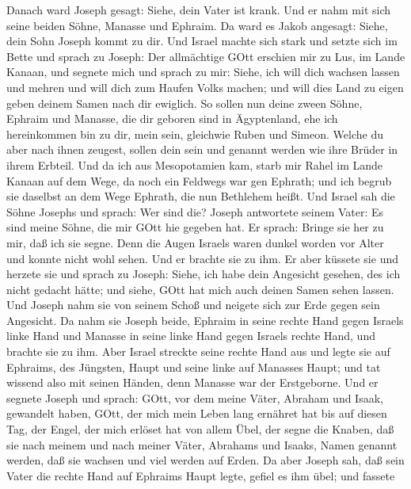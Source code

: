  Danach ward Joseph gesagt: Siehe, dein Vater ist krank. Und
er nahm mit sich seine beiden Söhne, Manasse und Ephraim. 
Da ward es Jakob angesagt: Siehe, dein Sohn Joseph kommt zu dir. Und
Israel machte sich stark und setzte sich im Bette  und
sprach zu Joseph: Der allmächtige GOtt erschien mir zu Lus, im Lande
Kanaan, und segnete mich  und sprach zu mir: Siehe, ich will
dich wachsen lassen und mehren und will dich zum Haufen Volks machen;
und will dies Land zu eigen geben deinem Samen nach dir ewiglich.
 So sollen nun deine zween Söhne, Ephraim und Manasse, die
dir geboren sind in Ägyptenland, ehe ich hereinkommen bin zu dir, mein
sein, gleichwie Ruben und Simeon.  Welche du aber nach ihnen
zeugest, sollen dein sein und genannt werden wie ihre Brüder in ihrem
Erbteil.  Und da ich aus Mesopotamien kam, starb mir Rahel
im Lande Kanaan auf dem Wege, da noch ein Feldwegs war gen Ephrath; und
ich begrub sie daselbst an dem Wege Ephrath, die nun Bethlehem heißt.
 Und Israel sah die Söhne Josephs und sprach: Wer sind die?
 Joseph antwortete seinem Vater: Es sind meine Söhne, die
mir GOtt hie gegeben hat. Er sprach: Bringe sie her zu mir, daß ich sie
segne.  Denn die Augen Israels waren dunkel worden vor
Alter und konnte nicht wohl sehen. Und er brachte sie zu ihm. Er aber
küssete sie und herzete sie  und sprach zu Joseph: Siehe,
ich habe dein Angesicht gesehen, des ich nicht gedacht hätte; und siehe,
GOtt hat mich auch deinen Samen sehen lassen.  Und Joseph
nahm sie von seinem Schoß und neigete sich zur Erde gegen sein
Angesicht.  Da nahm sie Joseph beide, Ephraim in seine
rechte Hand gegen Israels linke Hand und Manasse in seine linke Hand
gegen Israels rechte Hand, und brachte sie zu ihm.  Aber
Israel streckte seine rechte Hand aus und legte sie auf Ephraims, des
Jüngsten, Haupt und seine linke auf Manasses Haupt; und tat wissend also
mit seinen Händen, denn Manasse war der Erstgeborne.  Und
er segnete Joseph und sprach: GOtt, vor dem meine Väter, Abraham und
Isaak, gewandelt haben, GOtt, der mich mein Leben lang ernähret hat bis
auf diesen Tag,  der Engel, der mich erlöset hat von allem
Übel, der segne die Knaben, daß sie nach meinem und nach meiner Väter,
Abrahams und Isaaks, Namen genannt werden, daß sie wachsen und viel
werden auf Erden.  Da aber Joseph sah, daß sein Vater die
rechte Hand auf Ephraims Haupt legte, gefiel es ihm übel; und fassete
